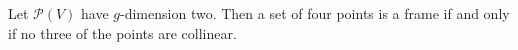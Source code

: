 Let $\mathcal{P}(V)$ have $g$-dimension two. Then a set of four points is a frame if and only if no three of the points are collinear.
